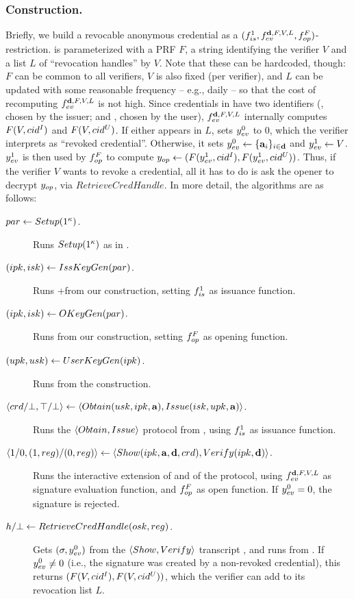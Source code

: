 \subsubsection{\CUASRAC Construction.} %
Briefly, we build a revocable anonymous credential as a $(f_{is}^1,
f_{ev}^{\mathbf{d},F,V,L},f_{op}^{F})$-\CUASGen restriction. \feval is
parameterized with a PRF $F$, a string identifying the verifier $V$ and a
list $L$ of ``revocation handles'' by $V$. Note that these can be hardcoded,
though: $F$ can be common to all verifiers, $V$ is also fixed (per verifier),
and $L$ can be updated with some reasonable frequency -- e.g., daily -- so that
the cost of recomputing $f_{ev}^{\mathbf{d},F,V,L}$ is not high.
%
Since credentials in \CUASGen have two identifiers (\cidi, chosen by the issuer;
and \cidu, chosen by the user), $f_{ev}^{\mathbf{d},F,V,L}$ internally computes
$F(V,cid^I)$ and $F(V,cid^U)$. If either appears in $L$, \feval sets $y_{ev}^0$
to $0$, which the verifier interprets as ``revoked credential''. Otherwise,
it sets $y_{ev}^0 \gets \lbrace \mathbf{a}_i \rbrace_{i\in\mathbf{d}}$ and
$y_{ev}^1 \gets V$. $y_{ev}^1$ is
then used by $f_{op}^F$ to compute $y_{op} \gets (F(y_{ev}^1,cid^I),
F(y_{ev}^1,cid^U))$. Thus, if the verifier $V$ wants to revoke a credential, all
it has to do is ask the opener to decrypt $y_{op}$, via $RetrieveCredHandle$.
%
In more detail, the algorithms are as follows:

\begin{description}
\item[$par \gets Setup(1^\kappa)$.] Runs $Setup(1^\kappa)$ as in
  \CUASGen.
\item[$(ipk,isk) \gets IssKeyGen(par)$.] Runs \KeyGen+\ISet from our
  \CUASGen construction, setting $f_{is}^1$ as issuance function.
\item[$(ipk,isk) \gets OKeyGen(par)$.] Runs \OKeyGen from our
  \CUASGen construction, setting $f_{op}^F$ as opening function.
\item[$(upk,usk) \gets UserKeyGen(ipk)$.] Runs \KeyGen from the
  \CUASGen construction.
\item[$\langle crd/\bot,\top/\bot \rangle \gets
  \langle Obtain(usk,ipk,\mathbf{a}),Issue(isk,upk,\mathbf{a}) \rangle$.]
  Runs the $\langle Obtain,Issue \rangle$ protocol from \CUASGen, using
  $f_{is}^1$ as issuance function.
\item[$\langle 1/0,(1,reg)/(0,reg)\rangle \gets \langle Show(ipk,
  \mathbf{a},\mathbf{d},crd),
  Verify(ipk,\mathbf{d}) \rangle$.]
  Runs the interactive extension of \Sign and \Verify of the \CUASGen protocol,
  using $f_{ev}^{\mathbf{d},F,V,L}$ as signature evaluation function, and
  $f_{op}^F$ as open function. If $y_{ev}^0 = 0$, the signature is rejected.
\item[$h/\bot \gets RetrieveCredHandle(osk,reg)$.]
  Gets $(\sigma,y_{ev}^0)$ from the $\langle Show,Verify\rangle$ transcript
  \utrans, and runs \Open from \CUASGen. If $y_{ev}^0 \neq 0$ (i.e., the
  signature was created by a non-revoked credential), this returns $(F(V,cid^I),
  F(V,cid^U))$, which the verifier can add to its revocation list $L$.
\end{description}

